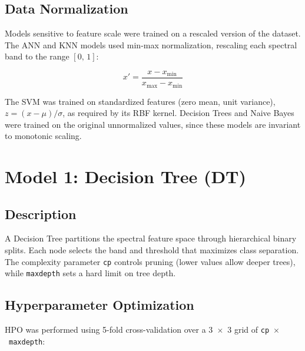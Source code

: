 \documentclass[12pt,a4paper]{article}
\begin{document}
\subsection{Data Normalization}

Models sensitive to feature scale were trained on a rescaled version of the dataset. The ANN and KNN models used min-max normalization, rescaling each spectral band to the range $[0,\,1]$:

\begin{equation}
x' = \frac{x - x_{\min}}{x_{\max} - x_{\min}}
\end{equation}

The SVM was trained on standardized features (zero mean, unit variance), $z = (x - \mu)/\sigma$, as required by its RBF kernel. Decision Trees and Naive Bayes were trained on the original unnormalized values, since these models are invariant to monotonic scaling.

\section{Model 1: Decision Tree (DT)}

\subsection{Description}

A Decision Tree partitions the spectral feature space through hierarchical binary splits. Each node selects the band and threshold that maximizes class separation. The complexity parameter \texttt{cp} controls pruning (lower values allow deeper trees), while \texttt{maxdepth} sets a hard limit on tree depth.

\subsection{Hyperparameter Optimization}

HPO was performed using 5-fold cross-validation over a 3~$\times$~3 grid of \texttt{cp}~$\times$~\texttt{maxdepth}:
\end{document}
